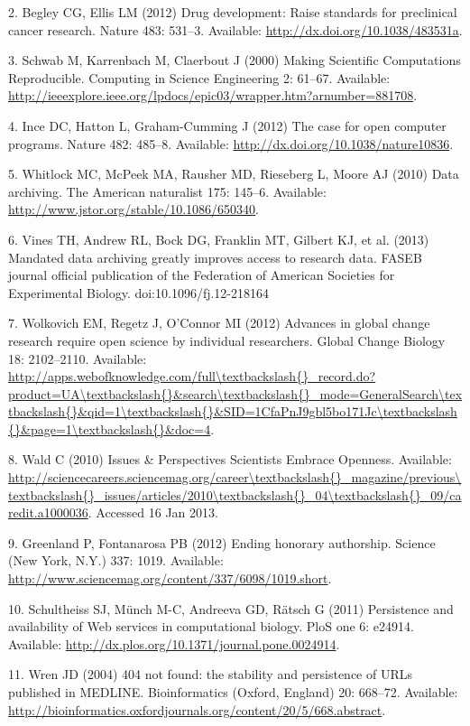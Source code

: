 \documentclass[]{article}
\begin{document}
2. Begley CG, Ellis LM (2012) Drug development: Raise standards for
preclinical cancer research. Nature 483: 531--3. Available:
\url{http://dx.doi.org/10.1038/483531a}.

3. Schwab M, Karrenbach M, Claerbout J (2000) Making Scientific
Computations Reproducible. Computing in Science Engineering 2: 61--67.
Available:
\url{http://ieeexplore.ieee.org/lpdocs/epic03/wrapper.htm?arnumber=881708}.

4. Ince DC, Hatton L, Graham-Cumming J (2012) The case for open computer
programs. Nature 482: 485--8. Available:
\url{http://dx.doi.org/10.1038/nature10836}.

5. Whitlock MC, McPeek MA, Rausher MD, Rieseberg L, Moore AJ (2010) Data
archiving. The American naturalist 175: 145--6. Available:
\url{http://www.jstor.org/stable/10.1086/650340}.

6. Vines TH, Andrew RL, Bock DG, Franklin MT, Gilbert KJ, et al. (2013)
Mandated data archiving greatly improves access to research data. FASEB
journal official publication of the Federation of American Societies for
Experimental Biology. doi:10.1096/fj.12-218164

7. Wolkovich EM, Regetz J, O'Connor MI (2012) Advances in global change
research require open science by individual researchers. Global Change
Biology 18: 2102--2110. Available:
\url{http://apps.webofknowledge.com/full\textbackslash{}_record.do?product=UA\textbackslash{}\&search\textbackslash{}_mode=GeneralSearch\textbackslash{}\&qid=1\textbackslash{}\&SID=1CfaPnJ9gbl5bo171Jc\textbackslash{}\&page=1\textbackslash{}\&doc=4}.

8. Wald C (2010) Issues \& Perspectives Scientists Embrace Openness.
Available:
\url{http://sciencecareers.sciencemag.org/career\textbackslash{}_magazine/previous\textbackslash{}_issues/articles/2010\textbackslash{}_04\textbackslash{}_09/caredit.a1000036}.
Accessed 16 Jan 2013.

9. Greenland P, Fontanarosa PB (2012) Ending honorary authorship.
Science (New York, N.Y.) 337: 1019. Available:
\url{http://www.sciencemag.org/content/337/6098/1019.short}.

10. Schultheiss SJ, Münch M-C, Andreeva GD, Rätsch G (2011) Persistence
and availability of Web services in computational biology. PloS one 6:
e24914. Available:
\url{http://dx.plos.org/10.1371/journal.pone.0024914}.

11. Wren JD (2004) 404 not found: the stability and persistence of URLs
published in MEDLINE. Bioinformatics (Oxford, England) 20: 668--72.
Available:
\url{http://bioinformatics.oxfordjournals.org/content/20/5/668.abstract}.
\end{document}
